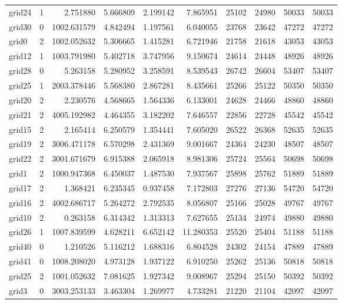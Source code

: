 \begin{longtable}{|l|r|r|r|r|r|r|r|r|r|}
grid24 & 1 & 2.751880 & 5.666809 & 2.199142 & 7.865951 & 25102 & 24980 & 50033 & 50033 \\
grid30 & 0 & 1002.631579 & 4.842494 & 1.197561 & 6.040055 & 23768 & 23642 & 47272 & 47272 \\
grid0 & 2 & 1002.052632 & 5.306665 & 1.415281 & 6.721946 & 21758 & 21618 & 43053 & 43053 \\
grid12 & 1 & 1003.791980 & 5.402718 & 3.747956 & 9.150674 & 24614 & 24448 & 48926 & 48926 \\
grid28 & 0 & 5.263158 & 5.280952 & 3.258591 & 8.539543 & 26742 & 26604 & 53407 & 53407 \\
grid25 & 1 & 2003.378446 & 5.568380 & 2.867281 & 8.435661 & 25266 & 25122 & 50350 & 50350 \\
grid20 & 2 & 2.230576 & 4.568665 & 1.564336 & 6.133001 & 24628 & 24466 & 48860 & 48860 \\
grid21 & 2 & 4005.192982 & 4.464355 & 3.182202 & 7.646557 & 22856 & 22728 & 45542 & 45542 \\
grid15 & 2 & 2.165414 & 6.250579 & 1.354441 & 7.605020 & 26522 & 26368 & 52635 & 52635 \\
grid19 & 2 & 3006.471178 & 6.570298 & 2.431369 & 9.001667 & 24364 & 24230 & 48507 & 48507 \\
grid22 & 2 & 3001.671679 & 6.915388 & 2.065918 & 8.981306 & 25724 & 25564 & 50698 & 50698 \\
grid1 & 2 & 1000.947368 & 6.450037 & 1.487530 & 7.937567 & 25898 & 25762 & 51889 & 51889 \\
grid17 & 2 & 1.368421 & 6.235345 & 0.937458 & 7.172803 & 27276 & 27136 & 54720 & 54720 \\
grid16 & 2 & 4002.686717 & 5.264272 & 2.792535 & 8.056807 & 25166 & 25028 & 49767 & 49767 \\
grid10 & 2 & 0.263158 & 6.314342 & 1.313313 & 7.627655 & 25134 & 24974 & 49880 & 49880 \\
grid26 & 1 & 1007.839599 & 4.628211 & 6.652142 & 11.280353 & 25520 & 25404 & 51188 & 51188 \\
grid40 & 0 & 1.210526 & 5.116212 & 1.688316 & 6.804528 & 24302 & 24154 & 47889 & 47889 \\
grid41 & 0 & 1008.208020 & 4.973128 & 1.937122 & 6.910250 & 25262 & 25136 & 50818 & 50818 \\
grid25 & 2 & 1001.052632 & 7.081625 & 1.927342 & 9.008967 & 25294 & 25150 & 50392 & 50392 \\
grid3 & 0 & 3003.253133 & 3.463304 & 1.269977 & 4.733281 & 21220 & 21104 & 42097 & 42097 \\

\end{longtable}
